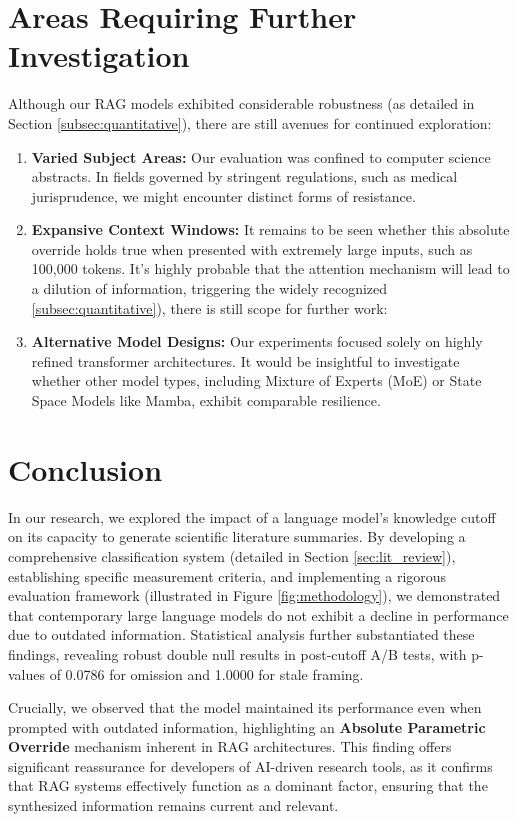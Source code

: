 \documentclass[acmsmall,screen,nonacm]{acmart}
\begin{document}
\section{Areas Requiring Further Investigation} \label{sec:gaps}
Although our RAG models exhibited considerable robustness (as detailed in Section \ref{subsec:quantitative}), there are still avenues for continued exploration:
\begin{enumerate}
\item \textbf{Varied Subject Areas:} Our evaluation was confined to computer science abstracts. In fields governed by stringent regulations, such as medical jurisprudence, we might encounter distinct forms of resistance.
\item \textbf{Expansive Context Windows:} It remains to be seen whether this absolute override holds true when presented with extremely large inputs, such as 100,000 tokens. It's highly probable that the attention mechanism will lead to a dilution of information, triggering the widely recognized 
\ref{subsec:quantitative}), there is still scope for further work:
\item \textbf{Alternative Model Designs:} Our experiments focused solely on highly refined transformer architectures. It would be insightful to investigate whether other model types, including Mixture of Experts (MoE) or State Space Models like Mamba, exhibit comparable resilience.
\end{enumerate}


\section{Conclusion} \label{sec:conclusion}
In our research, we explored the impact of a language model's knowledge cutoff on its capacity to generate scientific literature summaries. By developing a comprehensive classification system (detailed in Section \ref{sec:lit_review}), establishing specific measurement criteria, and implementing a rigorous evaluation framework (illustrated in Figure \ref{fig:methodology}), we demonstrated that contemporary large language models do not exhibit a decline in performance due to outdated information. Statistical analysis further substantiated these findings, revealing robust double null results in post-cutoff A/B tests, with p-values of 0.0786 for omission and 1.0000 for stale framing.

Crucially, we observed that the model maintained its performance even when prompted with outdated information, highlighting an \textbf{Absolute Parametric Override} mechanism inherent in RAG architectures. This finding offers significant reassurance for developers of AI-driven research tools, as it confirms that RAG systems effectively function as a dominant factor, ensuring that the synthesized information remains current and relevant.


\end{document}
